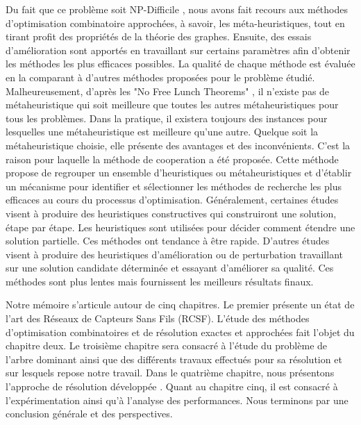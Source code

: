 Du fait que ce problème soit NP-Difficile \cite{shin2010approximation,zhang2008new}, nous avons fait recours aux méthodes d’optimisation combinatoire approchées, à savoir, les méta-heuristiques, tout en tirant profit des propriétés de la théorie des graphes. Ensuite, des essais d'amélioration sont apportés en travaillant sur certains paramètres afin d'obtenir les méthodes les plus efficaces possibles. La qualité de chaque méthode est évaluée en la comparant à d'autres méthodes proposées pour le problème étudié. Malheureusement, d'après les "No Free Lunch Theorems" \cite{wolpert1997no}, il n'existe pas de métaheuristique qui soit meilleure que toutes les autres métaheuristiques pour tous les problèmes. Dans la pratique, il existera toujours des instances pour lesquelles une métaheuristique est meilleure qu'une autre. Quelque soit la métaheuristique choisie, elle présente des avantages et des inconvénients. C’est la raison pour laquelle la méthode de cooperation a été proposée. Cette méthode propose de regrouper un ensemble d'heuristiques ou métaheuristiques et d'établir un mécanisme pour identifier et sélectionner les méthodes de recherche les plus efficaces au cours du processus d'optimisation. Généralement, certaines études visent à produire des heuristiques constructives qui construiront une solution, étape par étape. Les heuristiques sont utilisées pour décider comment étendre une solution partielle. Ces méthodes ont tendance à être rapide. D'autres études visent à produire des heuristiques d'amélioration ou de perturbation travaillant sur une solution candidate déterminée et essayant d'améliorer sa qualité. Ces méthodes sont plus lentes mais fournissent les meilleurs résultats finaux. 

Notre mémoire s’articule autour de cinq chapitres. Le premier présente un état de l’art des Réseaux de Capteurs Sans Fils (RCSF). L’étude des méthodes d’optimisation combinatoires et de résolution exactes et approchées fait l’objet du chapitre deux. Le troisième chapitre sera consacré à l’étude du problème de l’arbre dominant ainsi que des différents travaux effectués pour sa résolution et sur lesquels repose notre travail. Dans le quatrième chapitre, nous présentons l’approche de résolution développée . Quant au chapitre cinq, il est consacré à l’expérimentation ainsi qu’à l’analyse des
performances. Nous terminons par une conclusion générale et des perspectives.

